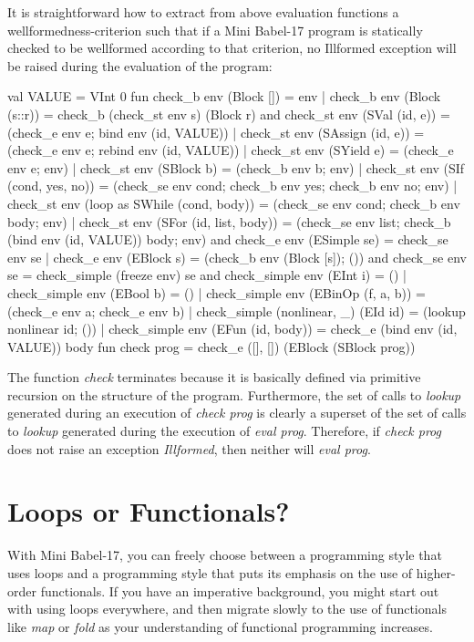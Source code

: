 \documentclass{llncs}
\begin{document}
It is straightforward how to extract from above evaluation functions a wellformedness-criterion such that  if a Mini Babel-17 program is statically checked to be wellformed according to that criterion, no Illformed exception will be raised during the evaluation of the program:
\begin{babellisting}
val VALUE = VInt 0
fun check_b env (Block []) = env
  | check_b env (Block (s::r)) = 
    	check_b (check_st env s) (Block r)    
and check_st env (SVal (id, e)) =
      (check_e env e; bind env (id, VALUE))
  | check_st env (SAssign (id, e)) =
  	  (check_e env e; rebind env (id, VALUE))
  | check_st env (SYield e) = (check_e env e; env)
  | check_st env (SBlock b) = (check_b env b; env)
  | check_st env (SIf (cond, yes, no)) =
      (check_se env cond; 
       check_b env yes; check_b env no; env)
  | check_st env (loop as SWhile (cond, body)) =
      (check_se env cond; check_b env body; env)
  | check_st env (SFor (id, list, body)) =
      (check_se env list; 
       check_b (bind env (id, VALUE)) body; env)
and check_e env (ESimple se) = check_se env se
  | check_e env (EBlock s) = 
  	  (check_b env (Block [s]); ()) 
and check_se env se = check_simple (freeze env) se
and check_simple env (EInt i) = ()
  | check_simple env (EBool b) = ()
  | check_simple env (EBinOp (f, a, b)) =
      (check_e env a; check_e env b)
  | check_simple (nonlinear, _) (EId id) = 
      (lookup nonlinear id; ())
  | check_simple env (EFun (id, body)) =
  	  check_e (bind env (id, VALUE)) body	  
fun check prog = check_e ([], []) (EBlock (SBlock prog))
\end{babellisting}
The function \textsl{check} terminates because it is basically defined via primitive recursion on the structure of the program. Furthermore, the set of calls to \textsl{lookup} generated during an execution of \textsl{check prog} is clearly a superset of the set of calls to \textsl{lookup} generated during the execution of \textsl{eval prog}.
Therefore, if \textsl{check prog} does not raise an exception \textsl{Illformed}, then neither will \textsl{eval prog}.

\section{Loops or Functionals?}
With Mini Babel-17, you can freely choose between a programming style that uses loops and a programming style that puts its emphasis on the use of higher-order functionals. If you have an imperative background, you might start out with using loops everywhere, and then migrate slowly to the use of functionals like \emph{map} or \emph{fold} as your understanding of functional programming increases.
\end{document}
